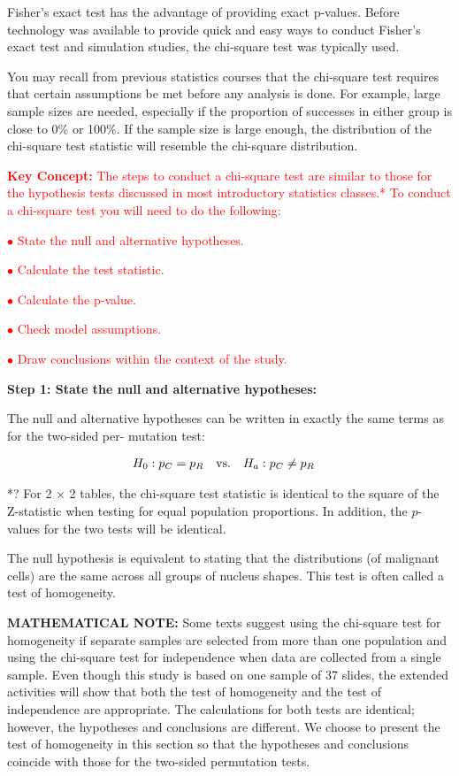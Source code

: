 \documentclass[
]{report}
\begin{document}
Fisher's exact test has the advantage of providing exact p-values. Before technology was available to provide
quick and easy ways to conduct Fisher's exact test and simulation studies, the chi-square test was typically
used.

You may recall from previous statistics courses that the chi-square test requires that certain assumptions
be met before any analysis is done. For example, large sample sizes are needed, especially if the proportion
of successes in either group is close to 0\% or 100\%. If the sample size is large enough, the distribution of the
chi-square test statistic will resemble the chi-square distribution.

\Large

\textbf{\textcolor{red}{Key Concept:}}
\textcolor{red}{The steps to conduct a chi-square test are similar to those for the hypothesis tests discussed in most
introductory statistics classes.* To conduct a chi-square test you will need to do the following:}

\textcolor{red}{$\bullet$ State the null and alternative hypotheses.}

\textcolor{red}{$\bullet$ Calculate the test statistic.}

\textcolor{red}{$\bullet$ Calculate the p-value.}

\textcolor{red}{$\bullet$ Check model assumptions.}

\textcolor{red}{$\bullet$ Draw conclusions within the context of the study.}
\normalsize

\textbf{Step 1: State the null and alternative hypotheses:}

The null and alternative hypotheses can be written in exactly the same terms as for the two-sided per-
mutation test:

\begin{align}
H_0: p_C &= p_R \quad\text{vs.}\quad H_a: p_C \neq p_R 
\notag
\end{align}

*? For 2 × 2 tables, the chi-square test statistic is identical to the square of the Z-statistic when testing for equal population proportions. In addition, the \(p\)-values for the two tests will be identical.

The null hypothesis is equivalent to stating that the distributions (of malignant cells) are the same
across all groups of nucleus shapes. This test is often called a test of homogeneity.

\large

\textbf{MATHEMATICAL NOTE:}
Some texts suggest using the chi-square test for homogeneity if separate samples are selected from
more than one population and using the chi-square test for independence when data are collected from
a single sample. Even though this study is based on one sample of 37 slides, the extended activities will
show that both the test of homogeneity and the test of independence are appropriate. The calculations
for both tests are identical; however, the hypotheses and conclusions are different. We choose to present
the test of homogeneity in this section so that the hypotheses and conclusions coincide with those for the
two-sided permutation tests.
\normalsize
\end{document}
